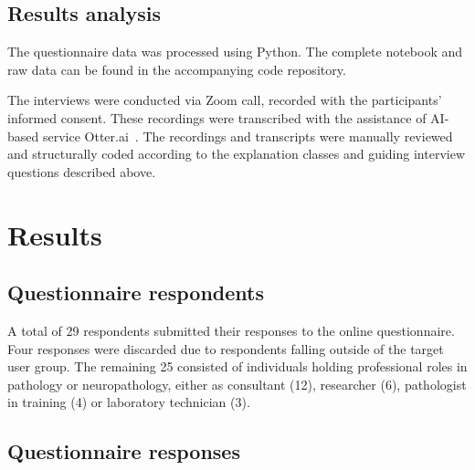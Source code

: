 \documentclass[final,5p,times,twocolumn,hyphens]{elsarticle}
\begin{document}
\subsection{Results analysis}

The questionnaire data was processed using Python. The complete notebook and raw data can be found in the accompanying code repository.

The interviews were conducted via Zoom call, recorded with the participants' informed consent. These recordings were transcribed with the assistance of AI-based service Otter.ai~\cite{otterai-2021}. The recordings and transcripts were manually reviewed and structurally coded according to the explanation classes and guiding interview questions described above.

\section{Results}
\label{sec:results}

\subsection{Questionnaire respondents}

A total of 29 respondents submitted their responses to the online questionnaire. Four responses were discarded due to respondents falling outside of the target user group. The remaining 25 consisted of individuals holding professional roles in pathology or neuropathology, either as consultant (12), researcher (6), pathologist in training (4) or laboratory technician (3). 

\subsection{Questionnaire responses}
\end{document}

